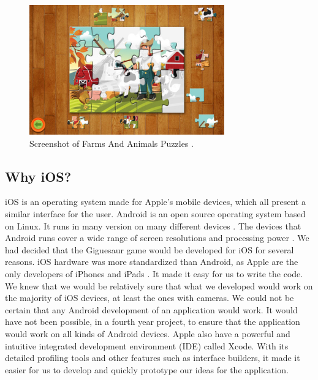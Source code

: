 \documentclass{article}
\begin{document}
\begin{figure}[ht]
\begin{center}
\includegraphics[width=0.75\textwidth]{images/FarmAnimalsJigsawImage}
\caption{Screenshot of Farms And Animals Puzzles \cite{img:FarmPuzzle}.}
\label{fig:FarmsAnimals}
\end{center}
\end{figure}

\subsection{Why iOS?}
\gls{iOS} is an operating system made for Apple's mobile devices, which all
present a similar interface for the user. \gls{Android} is an open source
operating system based on Linux. It runs in many version on many different
devices \cite{ref:AndroidDevices}. The devices that Android runs cover a wide
range of screen resolutions and processing power \cite{ref:AndroidHardware}. We
had decided that the Giguesaur game would be developed for iOS for several
reasons. iOS hardware was more standardized than Android, as Apple are the only
developers of iPhones and iPads \cite{ref:iOSHardware}. It made it easy for us
to write the code. We knew that we would be relatively sure that what we
developed would work on the majority of iOS devices, at least the ones with
cameras. We could not be certain that any Android development of an application
would work. It would have not been possible, in a fourth year project, to ensure
that the application would work on all kinds of Android devices. Apple also have
a powerful and intuitive integrated development environment (IDE) called
\gls{Xcode}. With its detailed profiling tools and other features such as
interface builders, it made it easier for us to develop and quickly prototype
our ideas for the application.

\end{document}
